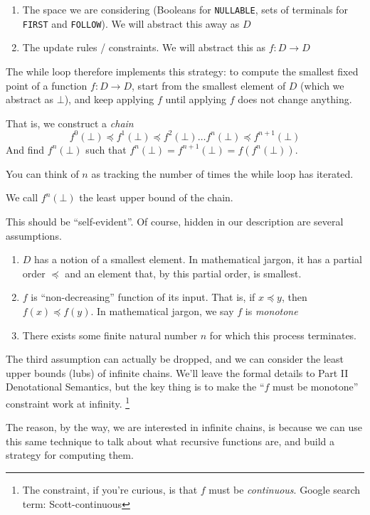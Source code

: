 \begin{enumerate}
    \item The space we are considering (Booleans for \texttt{NULLABLE}, sets of terminals for \texttt{FIRST} and \texttt{FOLLOW}). We will abstract this away as $D$
    \item The update rules / constraints. We will abstract this as $f: D \rightarrow D$
\end{enumerate}

The while loop therefore implements this strategy: to compute the smallest fixed point of a function $f: D \rightarrow D$, start from the smallest element of $D$ (which we abstract as $\bot$), and keep applying $f$ until applying $f$ does not change anything. 

That is, we construct a \textit{chain} 
\[ f^0(\bot) \preceq f^1(\bot) \preceq f^2(\bot) \ldots f^n(\bot) \preceq f^{n+1}(\bot)\]
And find $f^n(\bot)$ such that $f^n(\bot) = f^{n+1}(\bot) = f(f^n(\bot))$.

You can think of $n$ as tracking the number of times the while loop has iterated. 

We call $f^n(\bot)$ the least upper bound of the chain.

This should be ``self-evident''. Of course, hidden in our description are several assumptions.

\begin{enumerate}
    \item $D$ has a notion of a smallest element. In mathematical jargon, it has a partial order $\preceq$ and an element that, by this partial order, is smallest.
    \item $f$ is ``non-decreasing'' function of its input. That is, if $x \preceq y$, then $f(x) \preceq f(y)$. In mathematical jargon, we say $f$ is \textit{monotone}
    \item There exists some finite natural number $n$ for which this process terminates.
\end{enumerate}

The third assumption can actually be dropped, and we can consider the least upper bounds (lubs) of infinite chains. We'll leave the formal details to \textsf{Part II Denotational Semantics}, but the key thing is to make the ``$f$ must be monotone'' constraint work at infinity. \footnote{The constraint, if you're curious, is that $f$ must be \textit{continuous}. Google search term: Scott-continuous}

The reason, by the way, we are interested in infinite chains, is because we can use this same technique to talk about what recursive functions are, and build a strategy for computing them. 

